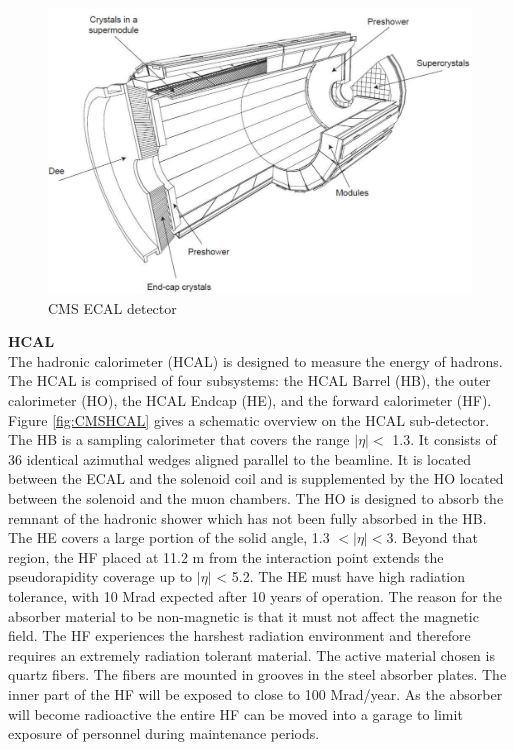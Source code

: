 \begin{figure}
  \includegraphics[width=\largefigwidth]{chap_CMSDetector_figures/cms_ECAL}
  \caption[CMS ECAL]%
  {CMS ECAL detector}
  \label{fig:CMSECAL}
\end{figure}


{\bf HCAL}  \\

The hadronic calorimeter (HCAL) is designed to measure the energy of hadrons. 
The HCAL is comprised of four subsystems: the HCAL Barrel (HB), the outer 
calorimeter (HO), the HCAL Endcap (HE), and the forward calorimeter (HF). 
Figure \ref{fig:CMSHCAL} gives a schematic overview on the HCAL sub-detector. 
The HB is a sampling calorimeter that covers the range $|\eta| < $ 1.3. 
It consists of 36 identical azimuthal wedges aligned parallel to the beamline. 
It is located between the ECAL and the 
solenoid coil and is supplemented by the HO located between the solenoid and the 
muon chambers. The HO is designed to absorb the remnant of the hadronic shower 
which has not been fully absorbed in the HB. The HE covers a large portion of the 
solid angle, 1.3 $< |\eta| < 3$. Beyond that region, the HF placed at 11.2 m from the 
interaction point extends the pseudorapidity coverage up to $|\eta|$ < 5.2. The HE must 
have high radiation tolerance, with 10 Mrad expected after 10 years of operation. 
The reason for the absorber material to be non-magnetic is that it must not affect 
the magnetic field. The HF experiences the harshest radiation environment and therefore 
requires an extremely radiation tolerant material. The active material chosen is 
quartz fibers.
The fibers are mounted in grooves in the steel absorber plates. The inner part of the HF will be 
exposed to close to 100 Mrad/year. As the absorber will become radioactive the entire HF can be moved into
a garage to limit exposure of personnel during maintenance periods.


